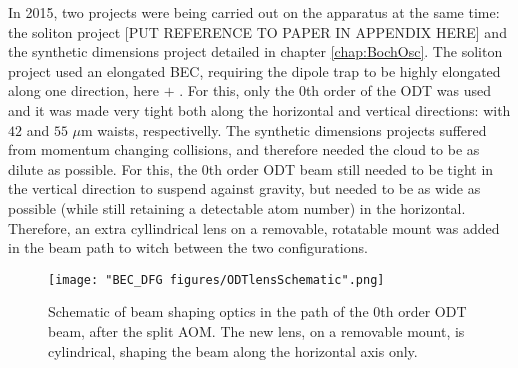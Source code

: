 In 2015, two projects were being carried out on the apparatus at the same time: the soliton project [PUT REFERENCE TO PAPER IN APPENDIX HERE]\cite{Aycock2017} and the synthetic dimensions project detailed in chapter \ref{chap:BochOsc}. The soliton project used an elongated BEC, requiring the dipole trap to be highly elongated along one direction, here \ex{} $+$ \ey{}. For this, only the 0th order of the ODT was used and it was made very tight both along the horizontal and vertical directions: with $42$ and $55$ $\mu$m waists, respectivelly. The synthetic dimensions projects suffered from momentum changing collisions, and therefore needed the cloud to be as dilute as possible. For this, the 0th order ODT beam still needed to be tight in the vertical direction to suspend against gravity, but needed to be as wide as possible (while still retaining a detectable atom number) in the horizontal. Therefore, an extra cyllindrical lens on a removable, rotatable mount was added in the beam path to witch between the two configurations. 


%

\begin{figure}
	\texttt{[image: "BEC\_DFG figures/ODTlensSchematic".png]}
\caption[Schematic of beam shaping optics in the path of the 0th order ODT beam]{Schematic of beam shaping optics in the path of the 0th order ODT beam, after the split AOM. The new lens, on a removable mount, is cylindrical, shaping the beam along the horizontal axis only. }
\label{fig:ODTlensSchematic}
\end{figure}

